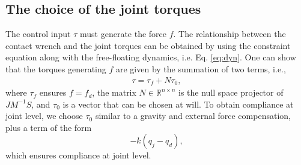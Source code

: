 \documentclass[final,5p,twocolumn]{elsarticle}
\newcommand{\mat}[1]{\ensuremath{\begin{bmatrix}#1\end{bmatrix}}}	%
\begin{document}

\subsection{The choice of the joint torques}
The control input $\tau$ must generate the force $f$. The relationship between the contact wrench and the joint torques can be obtained by using the constraint equation along with the free-floating dynamics, i.e. Eq. \eqref{eq:dyn}.
One can show that the torques generating $f$ are given by the summation of two terms, i.e.,
\begin{eqnarray}
        \label{tau}
        \tau = \tau_f + N \tau_0,
\end{eqnarray}
where $\tau_f $ ensures $f = f_d$, the matrix $N \in \mathbb{R}^{n\times n}$ is the null space projector of 
$JM^{-1}S$,
and $\tau_0$ is a vector that can be chosen at will. To obtain compliance at joint level, we choose $\tau_0$ similar to 
a gravity and external force compensation, plus a term of the form \[ -k(q_j - q_d),\]
which ensures  compliance at joint level.
\end{document}
